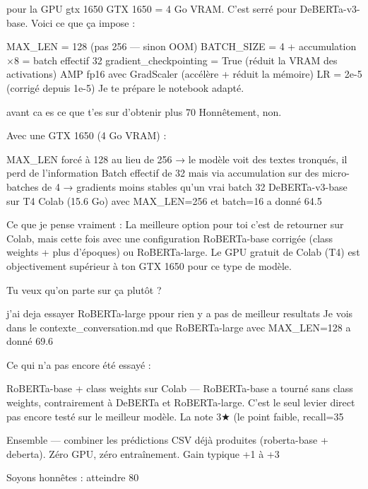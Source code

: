 pour la GPU  gtx 1650
GTX 1650 = 4 Go VRAM. C'est serré pour DeBERTa-v3-base. Voici ce que ça impose :

MAX_LEN = 128 (pas 256 — sinon OOM)
BATCH_SIZE = 4 + accumulation ×8 = batch effectif 32
gradient_checkpointing = True (réduit la VRAM des activations)
AMP fp16 avec GradScaler (accélère + réduit la mémoire)
LR = 2e-5 (corrigé depuis 1e-5)
Je te prépare le notebook adapté.

avant ca es ce que t'es sur d'obtenir plus 70%
Honnêtement, non.

Avec une GTX 1650 (4 Go VRAM) :

MAX_LEN forcé à 128 au lieu de 256 → le modèle voit des textes tronqués, il perd de l'information
Batch effectif de 32 mais via accumulation sur des micro-batches de 4 → gradients moins stables qu'un vrai batch 32
DeBERTa-v3-base sur T4 Colab (15.6 Go) avec MAX_LEN=256 et batch=16 a donné 64.5%

Ce que je pense vraiment :
La meilleure option pour toi c'est de retourner sur Colab, mais cette fois avec une configuration RoBERTa-base corrigée (class weights + plus d'époques) ou RoBERTa-large. Le GPU gratuit de Colab (T4) est objectivement supérieur à ton GTX 1650 pour ce type de modèle.

Tu veux qu'on parte sur ça plutôt ?

j'ai deja essayer RoBERTa-large ppour rien y a pas de meilleur resultats
Je vois dans le contexte_conversation.md que RoBERTa-large avec MAX_LEN=128 a donné 69.6%

Ce qui n'a pas encore été essayé :

RoBERTa-base + class weights sur Colab — RoBERTa-base a tourné sans class weights, contrairement à DeBERTa et RoBERTa-large. C'est le seul levier direct pas encore testé sur le meilleur modèle. La note 3★ (le point faible, recall=35%

Ensemble — combiner les prédictions CSV déjà produites (roberta-base + deberta). Zéro GPU, zéro entraînement. Gain typique +1 à +3%

Soyons honnêtes : atteindre 80%


